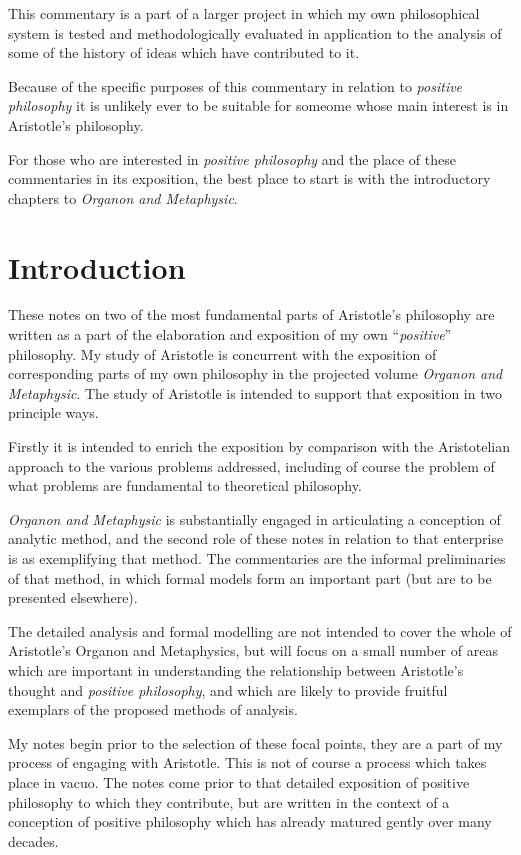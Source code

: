 This commentary is a part of a larger project in which my own philosophical system is tested and methodologically evaluated in application to the analysis of some of the history of ideas which have contributed to it.

Because of the specific purposes of this commentary in relation to \emph{positive philosophy} it is unlikely ever to be suitable for someome whose main interest is in Aristotle's philosophy.

For those who are interested in \emph{positive philosophy} and the place of these commentaries in its exposition, the best place to start is with the introductory chapters to \emph{Organon and Metaphysic}\cite{rbjbOrgMetap}.

\mainmatter

\chapter{Introduction}

These notes on two of the most fundamental parts of Aristotle's philosophy are written as a part of the elaboration and exposition of my own ``\emph{positive}'' philosophy.
My study of Aristotle is concurrent with the exposition of corresponding parts of my own philosophy in the projected volume \emph{Organon and Metaphysic}\cite{rbjbOrgMetap}.
The study of Aristotle is intended to support that exposition in two principle ways.

Firstly it is intended to enrich the exposition by comparison with the Aristotelian approach to the various problems addressed, including of course the problem of what problems are fundamental to theoretical philosophy.

\emph{Organon and Metaphysic} is substantially engaged in articulating a conception of analytic method, and the second role of these notes in relation to that enterprise is as exemplifying that method.
The commentaries are the informal preliminaries of that method, in which formal models form an important part (but are to be presented elsewhere).

The detailed analysis and formal modelling are not intended to cover the whole of Aristotle's Organon and Metaphysics, but will focus on a small number of areas which are important in understanding the relationship between Aristotle's thought and \emph{positive philosophy}, and which are likely to provide fruitful exemplars of the proposed methods of analysis.

My notes begin prior to the selection of these focal points, they are a part of my process of engaging with Aristotle.
This is not of course a process which takes place in vacuo.
The notes come prior to that detailed exposition of positive philosophy to which they contribute, but are written in the context of a conception of positive philosophy which has already matured gently over many decades.



